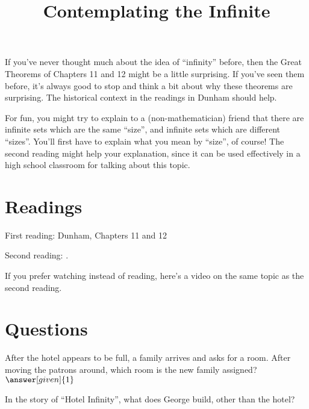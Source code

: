 \documentclass[nooutcomes]{ximera}
\title{Contemplating the Infinite}
\begin{document}
\begin{abstract}
    
\end{abstract}
\maketitle

If you've never thought much about the idea of ``infinity'' before, then the Great Theorems 
of Chapters 11 and 12 might be a little surprising.  If you've seen them before, it's always 
good to stop and think a bit about why these theorems are surprising.  The historical context 
in the readings in Dunham should help.

For fun, you might try to explain to a (non-mathematician) friend that there are infinite sets 
which are the same ``size'', and infinite sets which are different ``sizes''.  You'll first 
have to explain what you mean by ``size'', of course!  The second reading might help your 
explanation, since it can be used effectively in a high school classroom for talking about this 
topic.




\section{Readings}
First reading: Dunham, Chapters 11 and 12

Second reading: .

If you prefer watching instead of reading, here's a video on the same topic as the second reading.



\section{Questions}

\begin{question}
After the hotel appears to be full, a family arrives and asks for a room.  After moving the patrons around, which room is the new family assigned?
$\answer[given]{1}$
\end{question}

\begin{question}
In the story of ``Hotel Infinity'', what does George build, other than the hotel?
\begin{multipleChoice}
\end{multipleChoice}
\end{question}

%
%
\end{document}
